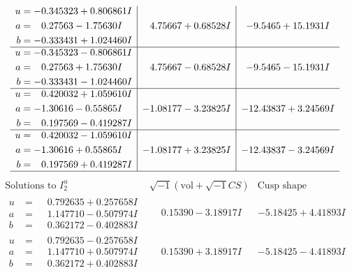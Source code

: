\documentclass[1p]{elsarticle_modified}
\theoremstyle{definition}
\newcommand{\I}{\sqrt{-1}}
\begin{document}
$$\begin{array}{c|c|c}
\begin{aligned}
u &= -0.345323 + 0.806861 I \\
a &= \phantom{-}0.27563 - 1.75630 I \\
b &= -0.333431 + 1.024460 I\end{aligned}
 & \phantom{-}4.75667 + 0.68528 I & -9.5465 + 15.1931 I \\ \hline\begin{aligned}
u &= -0.345323 - 0.806861 I \\
a &= \phantom{-}0.27563 + 1.75630 I \\
b &= -0.333431 - 1.024460 I\end{aligned}
 & \phantom{-}4.75667 - 0.68528 I & -9.5465 - 15.1931 I \\ \hline\begin{aligned}
u &= \phantom{-}0.420032 + 1.059610 I \\
a &= -1.30616 - 0.55865 I \\
b &= \phantom{-}0.197569 - 0.419287 I\end{aligned}
 & -1.08177 - 3.23825 I & -12.43837 + 3.24569 I \\ \hline\begin{aligned}
u &= \phantom{-}0.420032 - 1.059610 I \\
a &= -1.30616 + 0.55865 I \\
b &= \phantom{-}0.197569 + 0.419287 I\end{aligned}
 & -1.08177 + 3.23825 I & -12.43837 - 3.24569 I\\
 \hline 
 \end{array}$$\newpage$$\begin{array}{c|c|c}  
\text{Solutions to }I^u_{2}& \I (\text{vol} + \sqrt{-1}CS) & \text{Cusp shape}\\
 \hline 
\begin{aligned}
u &= \phantom{-}0.792635 + 0.257658 I \\
a &= \phantom{-}1.147710 - 0.507974 I \\
b &= \phantom{-}0.362172 - 0.402883 I\end{aligned}
 & \phantom{-}0.15390 - 3.18917 I & -5.18425 + 4.41893 I \\ \hline\begin{aligned}
u &= \phantom{-}0.792635 - 0.257658 I \\
a &= \phantom{-}1.147710 + 0.507974 I \\
b &= \phantom{-}0.362172 + 0.402883 I\end{aligned}
 & \phantom{-}0.15390 + 3.18917 I & -5.18425 - 4.41893 I \\ \hline\begin{aligned}

\end{aligned}
\end{array}$$
\end{document}
